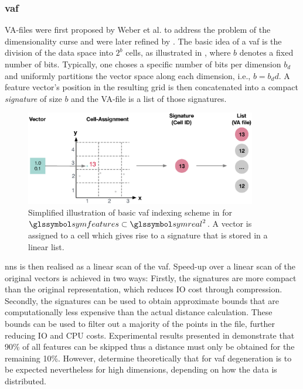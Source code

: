 \subsubsection{\acrfull{vaf}}

VA-files were first proposed by Weber et al. \cite{Weber:1998Va} to address the problem of the dimensionality curse and were later refined by \cite{Ferhatosmanoglu:2000Vector}. The basic idea of a \acrshort{vaf} is the division of the data space into $2^b$ cells, as illustrated in , where $b$ denotes a fixed number of bits. Typically, one choses a specific number of bits per dimension $b_d$ and uniformly partitions the vector space along each dimension, i.e., $b = b_dd$. A feature vector's position in the resulting grid is then concatenated into a compact \emph{signature} of size $b$ and the VA-file is a list of those signatures. 

\begin{figure}[bt]
\centering
\includegraphics[width=0.9\textwidth]{figures/vaf}
\caption{Simplified illustration of basic \acrshort{vaf} indexing scheme in for $\symfeatures \subset \symreal^2$. A vector is assigned to a cell which gives rise to a signature that is stored in a linear list.}
\label{fig:vaf}
\end{figure}

\acrshort{nns} is then realised as a linear scan of the \acrshort{vaf}. Speed-up over a linear scan of the original vectors is achieved in two ways: Firstly, the signatures are more compact than the original representation, which reduces IO cost through compression. Secondly, the signatures can be used to obtain approximate bounds that are computationally less expensive than the actual distance calculation. These bounds can be used to filter out a majority of the points in the file, further reducing IO and CPU costs. Experimental results presented in \cite{Weber:1998Va} demonstrate that 90\% of all features can be skipped thus a distance must only be obtained for the remaining 10\%. However, \cite{Echihabi:2021High} determine theoretically that for \acrshort{vaf} degeneration is to be expected nevertheless for high dimensions, depending on how the data is distributed.

